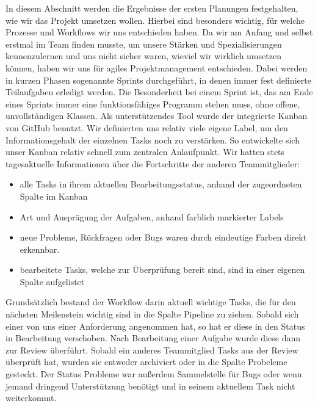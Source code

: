 \documentclass[12pt]{article}
\begin{document}
In diesem Abschnitt werden die Ergebnisse der ersten Planungen festgehalten, wie wir das Projekt umsetzen wollen. Hierbei sind besonders wichtig, für welche Prozesse und Workflows wir uns entschieden haben. \newline
Da wir am Anfang und selbst erstmal im Team finden musste, um unsere Stärken und Spezialisierungen kennenzulernen und uns nicht sicher waren, wieviel wir wirklich umsetzen können, haben wir uns für agiles Projektmanagement entschieden. Dabei werden in kurzen Phasen sogenannte Sprints durchgeführt, in denen immer fest definierte Teilaufgaben erledigt werden. Die Besonderheit bei einem Sprint ist, das am Ende eines Sprints immer eine funktionsfähiges Programm stehen muss, ohne offene, unvollständigen Klassen. \newline
Als unterstützendes Tool wurde der integrierte Kanban von GitHub benutzt. Wir definierten uns relativ viele eigene Label, um den Informationsgehalt der einzelnen Tasks noch zu verstärken.
So entwickelte sich unser Kanban relativ schnell zum zentralen Anlaufpunkt. Wir hatten stets tagesaktuelle Informationen über die Fortschritte der anderen Teammitglieder:
\begin{itemize}
	\item alle Tasks in ihrem aktuellen Bearbeitungsstatus, anhand der zugeordneten Spalte im Kanban
	\item Art und Ausprägung der Aufgaben, anhand farblich markierter Labels
	\item neue Probleme, Rückfragen oder Bugs waren durch eindeutige Farben direkt erkennbar.
	\item bearbeitete Tasks, welche zur Überprüfung bereit sind, sind in einer eigenen Spalte aufgelistet
\end{itemize}
Grundsätzlich bestand der Workflow darin aktuell wichtige Tasks, die für den nächsten Meilenstein wichtig sind in die Spalte \glqq Pipeline\grqq{} zu ziehen. Sobald sich einer von uns einer Anforderung angenommen hat, so hat er diese in den Status \glqq in Bearbeitung\grqq{} verschoben. Nach Bearbeitung einer Aufgabe wurde diese dann zur \glqq Review\grqq{} überführt. Sobald ein anderes Teammitglied Tasks aus der \glqq Review\grqq{} überprüft hat, wurden sie entweder archiviert oder in die Spalte \glqq Probeleme\grqq{} gesteckt. Der Status \glqq Probleme\grqq{} war außerdem Sammelstelle für Bugs oder wenn jemand dringend Unterstützung benötigt und in seinem aktuellem Task nicht weiterkommt.

\vspace{2cm}
\end{document}
